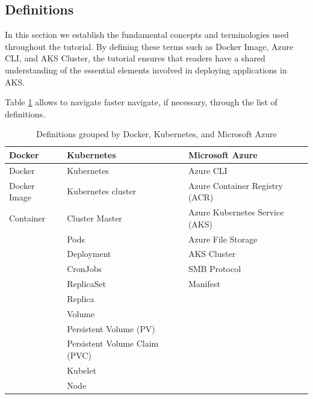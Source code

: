 \documentclass{article}
\begin{document}
\subsection*{Definitions}

In this section we establish the fundamental concepts and terminologies used throughout the tutorial. By defining these terms such as Docker Image, Azure CLI, and AKS Cluster, the tutorial ensures that readers have a shared understanding of the essential elements involved in deploying applications in AKS.

Table \ref{tab:defins} allows to navigate faster navigate, if necessary, through the list of definitions.

\begin{table}[h]
\centering
\begin{tabular}{|p{4cm}|p{4cm}|p{4cm}|}
\hline
\textbf{Docker} & \textbf{Kubernetes} & \textbf{Microsoft Azure} \\ \hline
Docker & Kubernetes & Azure CLI \\
Docker Image & Kubernetes cluster & Azure Container Registry (ACR) \\
Container & Cluster Master & Azure Kubernetes Service (AKS) \\
 & Pods & Azure File Storage \\
 & Deployment & AKS Cluster \\
 & CronJobs & SMB Protocol \\
 & ReplicaSet & Manifest \\
 & Replica &  \\
 & Volume &  \\
 & Persistent Volume (PV) &  \\
 & Persistent Volume Claim (PVC) &  \\
 & Kubelet &  \\
 & Node &  \\ \hline
\end{tabular}
\caption{Definitions grouped by Docker, Kubernetes, and Microsoft Azure}
\label{tab:defins}
\end{table}
\end{document}
